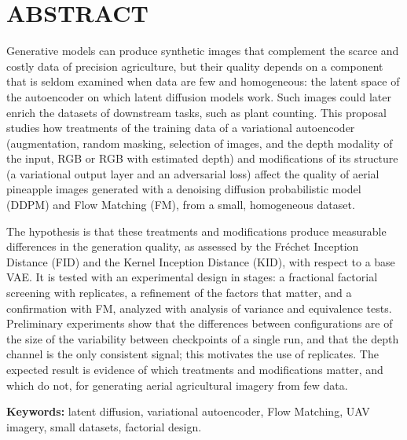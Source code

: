 \renewcommand{\baselinestretch}{1.5}
\chapter*{\centering \large ABSTRACT} %

Generative models can produce synthetic images that complement the scarce and costly data of precision agriculture, but their quality depends on a component that is seldom examined when data are few and homogeneous: the latent space of the autoencoder on which latent diffusion models work. Such images could later enrich the datasets of downstream tasks, such as plant counting. This proposal studies how treatments of the training data of a variational autoencoder (augmentation, random masking, selection of images, and the depth modality of the input, RGB or RGB with estimated depth) and modifications of its structure (a variational output layer and an adversarial loss) affect the quality of aerial pineapple images generated with a denoising diffusion probabilistic model (DDPM) and Flow Matching (FM), from a small, homogeneous dataset.

The hypothesis is that these treatments and modifications produce measurable differences in the generation quality, as assessed by the Fr\'echet Inception Distance (FID) and the Kernel Inception Distance (KID), with respect to a base VAE. It is tested with an experimental design in stages: a fractional factorial screening with replicates, a refinement of the factors that matter, and a confirmation with FM, analyzed with analysis of variance and equivalence tests. Preliminary experiments show that the differences between configurations are of the size of the variability between checkpoints of a single run, and that the depth channel is the only consistent signal; this motivates the use of replicates. The expected result is evidence of which treatments and modifications matter, and which do not, for generating aerial agricultural imagery from few data.

\vspace{0.5cm}
\noindent\textbf{Keywords:} latent diffusion, variational autoencoder, Flow Matching, UAV imagery, small datasets, factorial design.
